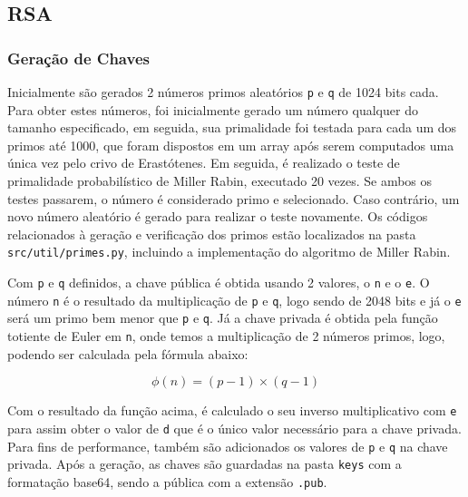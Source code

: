 \documentclass[12pt]{article}
\begin{document}
\subsection{RSA}
\subsubsection{Geração de Chaves}

Inicialmente são gerados 2 números primos aleatórios \texttt{p} e \texttt{q} de 1024 bits cada. Para obter estes números, foi inicialmente gerado um número qualquer do tamanho especificado, em seguida, sua primalidade foi testada para cada um dos primos até 1000, que foram dispostos em um array após serem computados uma única vez pelo crivo de Erastótenes. Em seguida, é realizado o teste de primalidade probabilístico de Miller Rabin, executado 20 vezes. Se ambos os testes passarem, o número é considerado primo e selecionado. Caso contrário, um novo número aleatório é gerado para realizar o teste novamente. Os códigos relacionados à geração e verificação dos primos estão localizados na pasta \texttt{src/util/primes.py}, incluindo a implementação do algoritmo de Miller Rabin.

Com \texttt{p} e \texttt{q} definidos, a chave pública é obtida usando 2 valores, o \texttt{n} e o \texttt{e}. O número \texttt{n} é o resultado da multiplicação de \texttt{p} e \texttt{q}, logo sendo de 2048 bits e já o \texttt{e} será um primo bem menor que \texttt{p} e \texttt{q}. Já a chave privada é obtida pela função totiente de Euler em \texttt{n}, onde temos a multiplicação de 2 números primos, logo, podendo ser calculada pela fórmula abaixo:

\[
    \phi(n) = (p-1) \times (q-1)
\]

Com o resultado da função acima, é calculado o seu inverso multiplicativo com \texttt{e} para assim obter o valor de \texttt{d} que é o único valor necessário para a chave privada. Para fins de performance, também são adicionados os valores de \texttt{p} e \texttt{q} na chave privada. Após a geração, as chaves são guardadas na pasta \texttt{keys} com a formatação base64, sendo a pública com a extensão \texttt{.pub}.

\subsubsection{}
\end{document}
